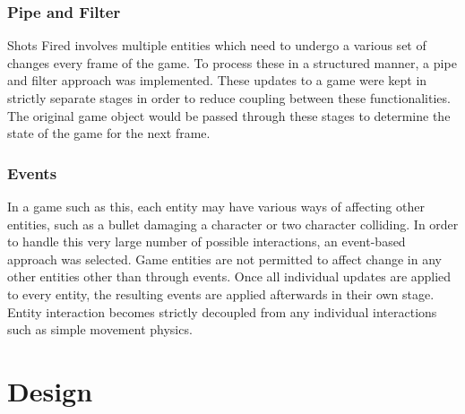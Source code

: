 \documentclass[12pt]{report}
\begin{document}
\subsection{Pipe and Filter}
Shots Fired involves multiple entities which need to undergo a various set of
changes every frame of the game.  To process these in a structured manner, a
pipe and filter approach was implemented.  These updates to a game were kept
in strictly separate stages in order to reduce coupling between these
functionalities.  The original game object would be passed through these stages
to determine the state of the game for the next frame.

\subsection{Events}
In a game such as this, each entity may have various ways of affecting other
entities, such as a bullet damaging a character or two character colliding.  In
order to handle this very large number of possible interactions, an event-based
approach was selected.  Game entities are not permitted to affect change in any
other entities other than through events.  Once all individual updates are
applied to every entity, the resulting events are applied afterwards in their
own stage.  Entity interaction becomes strictly decoupled from any individual
interactions such as simple movement physics.

\chapter{Design}
\end{document}
